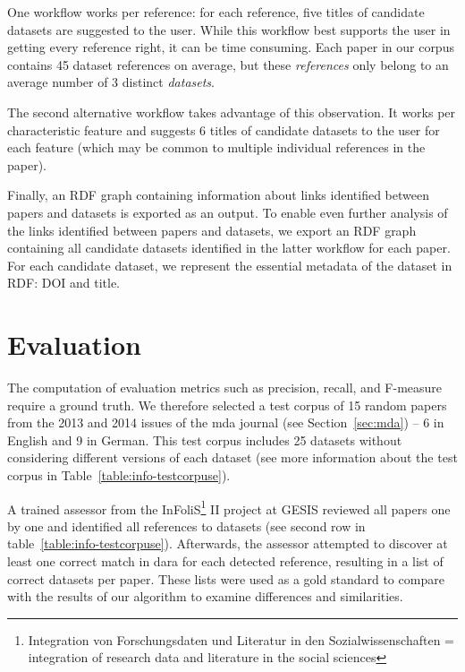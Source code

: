 \documentclass{IOS-Book-Article}
\newcommand{\dara}{\textsf{da\textbar ra}}
\begin{document}
One workflow works per reference: for each reference, five titles of candidate datasets are suggested to the user.
While this workflow best supports the user in getting every reference right, it can be time consuming.
Each paper in our corpus contains 45 dataset references on average, but these \emph{references} only belong to an average number of 3 distinct \emph{datasets}.

The second alternative workflow takes advantage of this observation.
It works per characteristic feature and suggests 6 titles of candidate datasets to the user for each feature (which may be common to multiple individual references in the paper). 

Finally, an RDF graph containing information about links identified between papers and datasets is exported as an output.
To enable even further analysis of the links identified between papers and datasets, we export an RDF graph containing all candidate datasets identified in the latter workflow for each paper.
For each candidate dataset, we represent the essential metadata of the dataset in RDF: DOI and title.


\section{Evaluation}
\label{sec:eval}
 \label{sec:eval}
 The computation of evaluation metrics such as precision, recall, and F-measure require a ground truth.
 We therefore selected a test corpus of 15 random papers from the 2013 and 2014 issues of the mda journal (see Section~\ref{sec:mda}) -- 6 in English and 9 in German.
This test corpus includes 25 datasets without considering different versions of each dataset (see more information about the test corpus in Table~\ref{table:info-testcorpuse}).

A trained assessor from the InFoliS\footnote{Integration von Forschungsdaten und Literatur in den Sozialwissenschaften = integration of research data and literature in the social sciences} II project at GESIS reviewed all papers one by one and identified all references to datasets (see second row in table~\ref{table:info-testcorpuse}).
Afterwards, the assessor attempted to discover at least one correct match in {\dara} for each detected reference, resulting in a list of correct datasets per paper.
These lists were used as a gold standard to compare with the results of our algorithm to examine differences and similarities.
\end{document}
